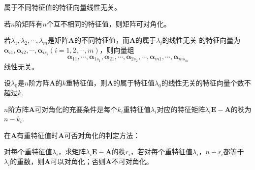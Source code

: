 \begin{theorem}
    属于不同特征值的特征向量线性无关。
\end{theorem}

\begin{theorem}
    若$n$阶矩阵有$n$个互不相同的特征值，则矩阵可对角化。
\end{theorem}

\begin{theorem}
    若$\lambda_1,\lambda_2,\cdots,\lambda_m$是矩阵$\boldsymbol{A}$的不同特征值，而$\boldsymbol{A}$的属于$\lambda_i$的线性无关
    的特征向量为$\boldsymbol{\alpha}_{i1},\boldsymbol{\alpha}_{i2},\cdots,\boldsymbol{\alpha}_{is_i}(i=1,2,\cdots,m)$，则向量组
    $$\boldsymbol{\alpha}_{11},\cdots,\boldsymbol{\alpha}_{1s_1},\boldsymbol{\alpha}_{21},\cdots,\boldsymbol{\alpha}_{2s_2},\cdots,\boldsymbol{\alpha}_{m1},\cdots,\boldsymbol{\alpha}_{ms_m}$$
    线性无关。
\end{theorem}

\begin{theorem}
    设$\lambda_0$是$n$阶方阵$\boldsymbol{A}$的$k$重特征值，则$\boldsymbol{A}$的属于特征值$\lambda_0$的线性无关的特征向量个数不超过$k$.
\end{theorem}

\begin{theorem}
    $n$阶方阵$\boldsymbol{A}$可对角化的充要条件是每个$k_i$重特征值$\lambda_i$对应的特征矩阵$\lambda_i\boldsymbol{E}-\boldsymbol{A}$的秩为$n-k_i$.
\end{theorem}

\begin{theorem}
    在$\boldsymbol{A}$有重特征值时$\boldsymbol{A}$可否对角化的判定方法：

    对每个重特征值$\lambda_i$，求矩阵$\lambda_i\boldsymbol{E}-\boldsymbol{A}$的秩$r_i$，若对每个重特征值$\lambda_i$，$n-r_i$都等于
    $\lambda_i$的重数，则$\boldsymbol{A}$可以对角化；否则$\boldsymbol{A}$不可对角化。
\end{theorem}

